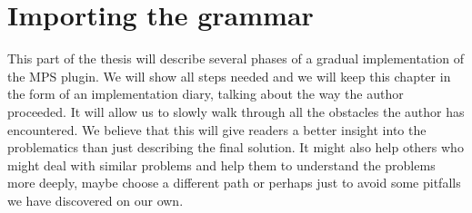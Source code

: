 \chapter{Importing the grammar}
\label{chap:importing_the_grammar}

This part of the thesis will describe several phases of a gradual implementation of the MPS plugin.
We will show all steps needed and we will keep this chapter in the form of an implementation diary, talking about the way the author proceeded.
It will allow us to slowly walk through all the obstacles the author has encountered.
We believe that this will give readers a better insight into the problematics than just describing the final solution.
It might also help others who might deal with similar problems and help them to understand the problems more deeply, maybe choose a different path or perhaps just to avoid some pitfalls we have discovered on our own.



\pagebreak



\pagebreak

%


%


%


%